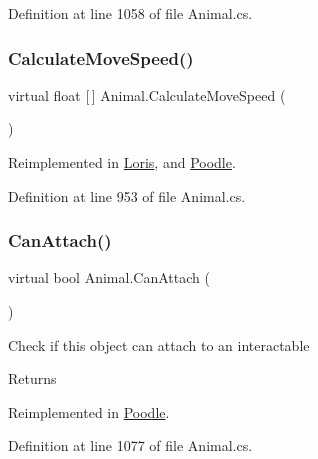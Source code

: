 Definition at line 1058 of file Animal.\+cs.

\mbox{\label{class_animal_ad1033798d72c010a822937be75c5bdde}} 
\subsubsection{\texorpdfstring{Calculate\+Move\+Speed()}{CalculateMoveSpeed()}}
{\footnotesize\ttfamily virtual float \mbox{[}$\,$\mbox{]} Animal.\+Calculate\+Move\+Speed (\begin{DoxyParamCaption}{ }\end{DoxyParamCaption})\hspace{0.3cm}{\ttfamily [virtual]}}



Reimplemented in \mbox{\hyperlink{class_loris_a5356c9fe0717f3c6fe10be650cbe3c48}{Loris}}, and \mbox{\hyperlink{class_poodle_afded59108342a9d5c41b91305911752b}{Poodle}}.



Definition at line 953 of file Animal.\+cs.

\mbox{\label{class_animal_a4809045a8807c4b2e0d7569b806740ee}} 
\subsubsection{\texorpdfstring{Can\+Attach()}{CanAttach()}}
{\footnotesize\ttfamily virtual bool Animal.\+Can\+Attach (\begin{DoxyParamCaption}{ }\end{DoxyParamCaption})\hspace{0.3cm}{\ttfamily [virtual]}}



Check if this object can attach to an interactable 

\begin{DoxyReturn}{Returns}

\end{DoxyReturn}


Reimplemented in \mbox{\hyperlink{class_poodle_a1176b4dc1a07c88c75498f4fc80aba4a}{Poodle}}.



Definition at line 1077 of file Animal.\+cs.

